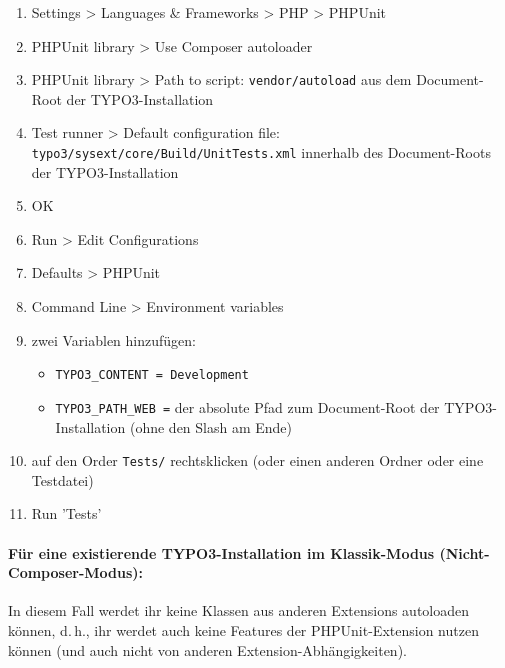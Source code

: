 \documentclass[a4paper,10pt,headsepline]{scrartcl}
\begin{document}
\begin{enumerate}
  \item Settings > Languages \& Frameworks > PHP > PHPUnit
  \item PHPUnit library > Use Composer autoloader
  \item PHPUnit library > Path to script: \texttt{vendor/autoload} aus dem Document-Root der TYPO3-Installation
  \item Test runner > Default configuration file: \texttt{typo3/sysext/core/Build/UnitTests.xml} innerhalb des Document-Roots der TYPO3-Installation
  \item OK
  \item Run > Edit Configurations
  \item Defaults > PHPUnit
  \item Command Line > Environment variables
  \item zwei Variablen hinzufügen:
    \begin{itemize}
      \item \texttt{TYPO3\_CONTENT = Development}
      \item \texttt{TYPO3\_PATH\_WEB =} der absolute Pfad zum Document-Root der TYPO3-Installation (ohne den Slash am Ende)
    \end{itemize}
  \item auf den Order \texttt{Tests/} rechtsklicken (oder einen anderen Ordner oder eine Testdatei)
  \item Run 'Tests'
\end{enumerate}


\paragraph{Für eine existierende TYPO3-Installation im Klassik-Modus (Nicht-Composer-Modus):}

In diesem Fall werdet ihr keine Klassen aus anderen Extensions autoloaden können, d.\,h., ihr werdet auch keine Features der PHPUnit-Extension nutzen können (und auch nicht von anderen Extension-Abhängigkeiten).
\end{document}
